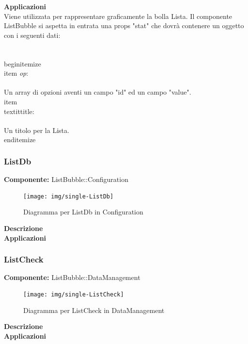 \textbf{Applicazioni}\\
Viene utilizzata per rappresentare graficamente la bolla Lista.
Il componente ListBubble si aspetta in entrata una props "stat" che dovrà contenere un oggetto con i seguenti dati: \\\\
\\begin{itemize}
\\item \textit{op}:
\\\\
Un array di opzioni aventi un campo "id" ed un campo "value".
\\item \\textit{title}:
\\\\
Un titolo per la Lista.
\\end{itemize} 


\clearpage

\subsubsection{ListDb}
\textbf{Componente:}  ListBubble::Configuration\\
   \FloatBarrier
   \begin{figure}[ht]
   \centering
   \texttt{[image: img/single-ListDb]}
   \caption{{Diagramma per ListDb in Configuration}}
\end{figure}
\FloatBarrier
\textbf{Descrizione}\\
 


\textbf{Applicazioni}\\
 


\clearpage

\subsubsection{ListCheck}
\textbf{Componente:}  ListBubble::DataManagement\\
   \FloatBarrier
   \begin{figure}[ht]
   \centering
   \texttt{[image: img/single-ListCheck]}
   \caption{{Diagramma per ListCheck in DataManagement}}
\end{figure}
\FloatBarrier
\textbf{Descrizione}\\
 


\textbf{Applicazioni}\\
 


